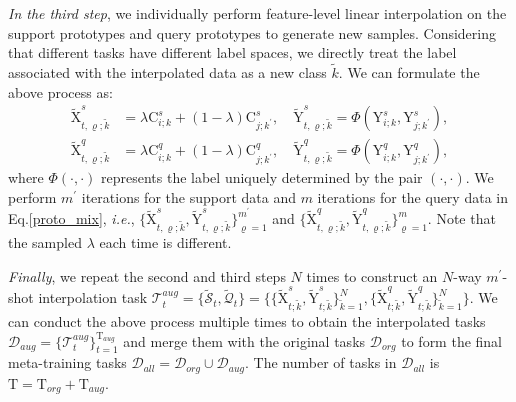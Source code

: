 \textit{In the third step}, we individually perform feature-level linear interpolation on the support prototypes and query prototypes to generate new samples. Considering that different tasks have different label spaces, we directly treat the label associated with the interpolated data as a new class $\tilde{k}$. We can formulate the above process as:
\begin{equation}
\label{proto_mix}
    \begin{aligned}
        \tilde{\mathrm{X}}_{t,\varrho;\tilde{k}}^s\!&=\!\lambda\mathrm{C}_{i;k}^s\!+\!(1\!-\!\lambda)\mathrm{C}_{j;k^\prime}^s, \quad \tilde{\mathrm{Y}}_{t,\varrho;\tilde{k}}^s\!=\!\Phi(\mathrm{Y}_{i;k}^s,\mathrm{Y}_{j;k^\prime}^s), \\
        \tilde{\mathrm{X}}_{t,\varrho;\tilde{k}}^q\!&=\!\lambda\mathrm{C}_{i;k}^q\!+\!(1\!-\!\lambda)\mathrm{C}_{j;k^\prime}^q, \quad \tilde{\mathrm{Y}}_{t,\varrho;\tilde{k}}^q\!=\!\Phi(\mathrm{Y}_{i;k}^q,\mathrm{Y}_{j;k^\prime}^q),
    \end{aligned}
\end{equation}
where $\Phi(\cdot,\cdot)$ represents the label uniquely determined by the pair $(\cdot,\cdot)$. We perform $m^\prime$ iterations for the support data and $m$ iterations for the query data in Eq.\ref{proto_mix}, %
\textit{i.e.}, $\{\tilde{\mathrm{X}}_{t,\varrho;\tilde{k}}^s,\tilde{\mathrm{Y}}_{t,\varrho;\tilde{k}}^s\}_{\varrho=1}^{m^\prime}$ and $\{\tilde{\mathrm{X}}_{t,\varrho;\tilde{k}}^q,\tilde{\mathrm{Y}}_{t,\varrho;\tilde{k}}^q\}_{\varrho=1}^{m}$. Note that the sampled $\lambda$ each time is different.

\textit{Finally}, we repeat the second and third steps $N$ times to construct an $N$-way $m^\prime$-shot interpolation task $\mathcal{T}_t^{aug}\!=\!\{\tilde{\mathcal{S}}_t,\tilde{\mathcal{Q}}_t\}\!=\!\{\{\tilde{\mathrm{X}}_{t;\tilde{k}}^s,\tilde{\mathrm{Y}}_{t;\tilde{k}}^s\}_{\tilde k=1}^N, \{\tilde{\mathrm{X}}_{t;\tilde{k}}^q, \tilde{\mathrm{Y}}_{t;\tilde{k}}^q\}_{\tilde k=1}^N\}$. We can conduct the above process multiple times to obtain the interpolated tasks $\mathcal{D}_{aug}\!=\!\{\mathcal{T}_t^{aug}\}_{t=1}^{\mathrm{T}_{aug}}$ and merge them with the original tasks $\mathcal{D}_{org}$ to form the final meta-training tasks $\mathcal{D}_{all}\!=\!\mathcal{D}_{org}\!\cup\!\mathcal{D}_{aug}$. The number of tasks in $\mathcal{D}_{all}$ is $\mathrm{T}\!=\!\mathrm{T}_{org}\!+\!\mathrm{T}_{aug}$.

